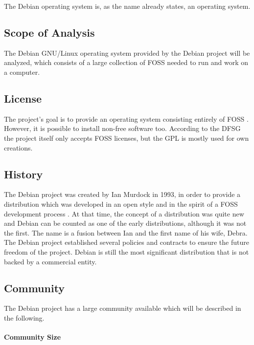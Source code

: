 The Debian operating system is, as the name already states, an operating
system.

\subsection{Scope of Analysis}

The Debian \acs{GNU}/Linux operating system provided by the Debian project will
be analyzed, which consists of a large collection of \ac{FOSS} needed to run
and work on a computer.

\subsection{License}

The project's goal is to provide an operating system consisting entirely of
\ac{FOSS} \cite{DebianLicense,DebianFAQ}. However, it is possible to install
non-free software too. According to the \ac{DFSG} the project itself only
accepts \ac{FOSS} licenses, but the \ac{GPL} is mostly used for own
creations.

\subsection{History}

The Debian project was created by Ian Murdock in 1993, in order to provide a
distribution which was developed in an open style and in the spirit of a
\ac{FOSS} development process \cite{DebianAbout,DebianHistory,Sadowski2008}. At
that time, the concept of a distribution was quite new and Debian can be
counted as one of the early distributions, although it was not the first. The
name is a fusion between Ian and the first name of his wife, Debra. The Debian
project established several policies and contracts to ensure the future freedom
of the project. Debian is still the most significant distribution that is not
backed by a commercial entity.

\subsection{Community}

The Debian project has a large community available which will be described in
the following.

\paragraph{Community Size}

